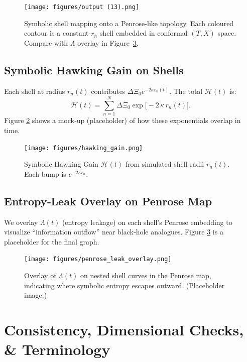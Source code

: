 \documentclass[11pt]{article}
\newcommand{\Contradiction}{\Xi}
\newcommand{\Leak}{\Lambda}
\newcommand{\Curv}{\kappa}
\newcommand{\Hgain}{\mathcal{H}}
\begin{document}
\begin{figure}[H]
  \centering
  \texttt{[image: figures/output (13).png]}
  \caption{Symbolic shell mapping onto a Penrose-like topology. Each coloured contour is a constant-\(r_n\) shell embedded in conformal \((T,X)\) space. Compare with \(\Leak\) overlay in Figure~\ref{fig:penrose_leak_overlay}.}
  \label{fig:penrose_nested_shells}
\end{figure}

\subsection{Symbolic Hawking Gain on Shells}
Each shell at radius \(r_n(t)\) contributes \(\Delta\Contradiction_0 e^{-2\Curv r_n(t)}\). The total \(\Hgain(t)\) is:
\[
  \Hgain(t) = \sum_{n=1}^N \Delta\Contradiction_{0}\exp\bigl[-2\,\Curv\,r_n(t)\bigr].
\]
Figure \ref{fig:hawking_gain} shows a mock‐up (placeholder) of how these exponentials overlap in time.

\begin{figure}[H]
  \centering
  \texttt{[image: figures/hawking\_gain.png]}
  \caption{Symbolic Hawking Gain \(\Hgain(t)\) from simulated shell radii \(r_n(t)\). Each bump is \(e^{-2\Curv r_n}\).}
  \label{fig:hawking_gain}
\end{figure}

\subsection{Entropy‐Leak Overlay on Penrose Map}
We overlay \(\Leak(t)\) (entropy leakage) on each shell’s Penrose embedding to visualize “information outflow” near black‐hole analogues. Figure \ref{fig:penrose_leak_overlay} is a placeholder for the final graph.

\begin{figure}[H]
  \centering
  \texttt{[image: figures/penrose\_leak\_overlay.png]}
  \caption{Overlay of \(\Leak(t)\) on nested shell curves in the Penrose map, indicating where symbolic entropy escapes outward. (Placeholder image.)}
  \label{fig:penrose_leak_overlay}
\end{figure}

\section{Consistency, Dimensional Checks, \& Terminology}
\end{document}
